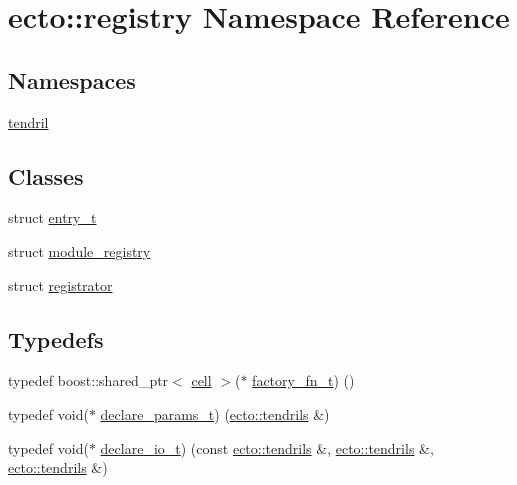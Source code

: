 \hypertarget{namespaceecto_1_1registry}{}\section{ecto\+:\+:registry Namespace Reference}
\label{namespaceecto_1_1registry}
\subsection*{Namespaces}
\begin{DoxyCompactItemize}
\item 
 \hyperlink{namespaceecto_1_1registry_1_1tendril}{tendril}
\end{DoxyCompactItemize}
\subsection*{Classes}
\begin{DoxyCompactItemize}
\item 
struct \hyperlink{structecto_1_1registry_1_1entry__t}{entry\+\_\+t}
\item 
struct \hyperlink{structecto_1_1registry_1_1module__registry}{module\+\_\+registry}
\item 
struct \hyperlink{structecto_1_1registry_1_1registrator}{registrator}
\end{DoxyCompactItemize}
\subsection*{Typedefs}
\begin{DoxyCompactItemize}
\item 
typedef boost\+::shared\+\_\+ptr$<$ \hyperlink{structecto_1_1cell}{cell} $>$($\ast$ \hyperlink{namespaceecto_1_1registry_afc9d1f3d51e708d9304a2f1e77cf4e4c}{factory\+\_\+fn\+\_\+t}) ()
\item 
typedef void($\ast$ \hyperlink{namespaceecto_1_1registry_ac7ab506518f9462777eb958eeff86d4f}{declare\+\_\+params\+\_\+t}) (\hyperlink{classecto_1_1tendrils}{ecto\+::tendrils} \&)
\item 
typedef void($\ast$ \hyperlink{namespaceecto_1_1registry_aeb28ed8594052fabba16371c256380c4}{declare\+\_\+io\+\_\+t}) (const \hyperlink{classecto_1_1tendrils}{ecto\+::tendrils} \&, \hyperlink{classecto_1_1tendrils}{ecto\+::tendrils} \&, \hyperlink{classecto_1_1tendrils}{ecto\+::tendrils} \&)
\end{DoxyCompactItemize}
